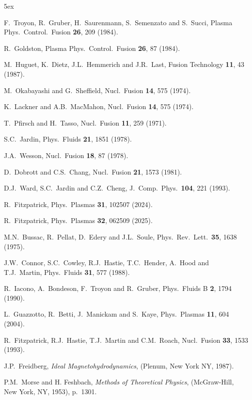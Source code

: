 \documentclass[12pt,prb,aps]{revtex4-1}
\begin{document}
\begin{thebibliography}{99}\baselineskip 5ex

   F.~Troyon, R.~Gruber, H.~Saurenmann, S.~Semenzato and S.~Succi, Plasma Phys.\ Control.\ Fusion {\bf 26}, 209 (1984). 

 R.~Goldston, Plasma Phys.\ Control.\ Fusion {\bf 26}, 87 (1984).

 M.~Huguet, K.~Dietz,  J.L.~Hemmerich and J.R.~Last, Fusion Technology  {\bf 11}, 43 (1987).

 M.~Okabayashi and G.~Sheffield, Nucl.\ Fusion {\bf 14}, 575 (1974). 

 K.~Lackner and A.B.~MacMahon, Nucl.\ Fusion {\bf 14}, 575 (1974). 

 T.~Pfirsch and H.~Tasso, Nucl.\ Fusion {\bf 11}, 259 (1971).

 S.C.~Jardin, Phys.\ Fluids {\bf 21}, 1851 (1978). 

 J.A.~Wesson, Nucl.\ Fusion {\bf 18}, 87 (1978).

 D.~Dobrott and C.S.~Chang, Nucl.\ Fusion {\bf 21}, 1573 (1981).

 D.J.~Ward, S.C.~Jardin and C.Z.~Cheng, J.\ Comp.\ Phys.\ {\bf 104}, 221 (1993).

 R.~Fitzpatrick, Phys.\ Plasmas {\bf 31}, 102507 (2024).

 R.~Fitzpatrick, Phys.\ Plasmas {\bf 32}, 062509 (2025).

 M.N.~Bussac, R.~Pellat, D.~Edery and J.L.~Soule, Phys.\ Rev.\ Lett.\ {\bf 35}, 1638 (1975).

 J.W.~Connor,  S.C.~Cowley, R.J.~Hastie,  T.C.~Hender,  A.~Hood  and T.J.~Martin,  Phys.\ Fluids {\bf 31}, 577 (1988).

 R.~Iacono, A.~Bondeson, F.~Troyon and R.~Gruber, Phys.\ Fluids B {\bf 2}, 1794 (1990).

 L.~Guazzotto,  R.~Betti, J.~Manickam and  S.~Kaye, Phys.\ Plasmas {\bf 11}, 604 (2004).

 R.~Fitzpatrick, R.J.~Hastie, T.J.~Martin and C.M.~Roach, Nucl.\ Fusion {\bf 33}, 1533 (1993).

 J.P.~Freidberg, {\em Ideal Magnetohydrodynamics}, (Plenum, New York NY, 1987).

 P.M.~Morse and H. Feshbach, {\em Methods of Theoretical Physics}, (McGraw-Hill, New York, NY, 1953), p.~1301.


\end{thebibliography}
\end{document}
